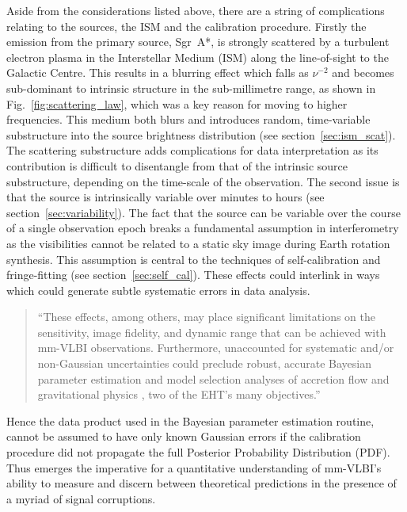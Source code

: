 Aside from the considerations listed above, there are a string of complications relating to the sources, the ISM and the calibration procedure. 
Firstly the emission from the primary source, Sgr~A*, is strongly scattered by a turbulent electron plasma in the Interstellar Medium (ISM) along the line-of-sight to the Galactic Centre. This results in a blurring effect \citep[e.g.][]{Fish_2014} which falls as $\nu^{-2}$ and becomes sub-dominant to intrinsic structure in the sub-millimetre range, as shown in Fig.~\ref{fig:scattering_law}, which was a key reason for moving to higher frequencies. This medium both blurs and introduces random, time-variable substructure into the source brightness distribution (see section~\ref{sec:ism_scat}). The scattering substructure adds complications for data interpretation as its contribution is difficult to disentangle from that of the intrinsic source substructure, depending on the time-scale of the observation.
The second issue is that the source is intrinsically variable over minutes to hours (see section~\ref{sec:variability}). The fact that the source can be variable over the course of a single observation epoch breaks a fundamental assumption in interferometry as the visibilities cannot be related to a static sky image during Earth rotation synthesis. This assumption is central to the techniques of self-calibration and fringe-fitting (see section~\ref{sec:self_cal}).
These effects could interlink in ways which could generate subtle systematic errors in data analysis. 


\begin{quotation}
``These effects, among others, may place significant limitations on the sensitivity, image fidelity, and dynamic range that can be achieved with mm-VLBI observations.  Furthermore, unaccounted for systematic and/or non-Gaussian uncertainties could preclude robust, accurate Bayesian parameter estimation and model selection analyses of accretion flow \citep[e.g.][]{Broderick_2016} and gravitational physics \citep[e.g.][]{Broderick_2014, Psaltis_2016}, two of the EHT's many objectives.''\\
\citep{Blecher_2016}
\end{quotation}


Hence the data product used in the Bayesian parameter estimation routine, cannot be assumed to have only known Gaussian errors if the calibration procedure did not propagate the full Posterior Probability Distribution (PDF). Thus emerges the imperative for a quantitative understanding of mm-VLBI's ability to measure and discern between theoretical predictions in the presence of a myriad of signal corruptions.

